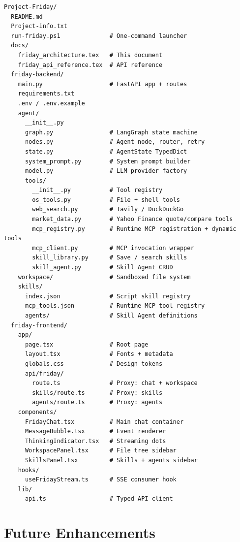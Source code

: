 \documentclass[11pt,a4paper]{article}
\begin{document}
\begin{lstlisting}[language={},title={Full monorepo layout}]
Project-Friday/
  README.md
  Project-info.txt
  run-friday.ps1              # One-command launcher
  docs/
    friday_architecture.tex   # This document
    friday_api_reference.tex  # API reference
  friday-backend/
    main.py                   # FastAPI app + routes
    requirements.txt
    .env / .env.example
    agent/
      __init__.py
      graph.py                # LangGraph state machine
      nodes.py                # Agent node, router, retry
      state.py                # AgentState TypedDict
      system_prompt.py        # System prompt builder
      model.py                # LLM provider factory
      tools/
        __init__.py           # Tool registry
        os_tools.py           # File + shell tools
        web_search.py         # Tavily / DuckDuckGo
        market_data.py        # Yahoo Finance quote/compare tools
        mcp_registry.py       # Runtime MCP registration + dynamic tools
        mcp_client.py         # MCP invocation wrapper
        skill_library.py      # Save / search skills
        skill_agent.py        # Skill Agent CRUD
    workspace/                # Sandboxed file system
    skills/
      index.json              # Script skill registry
      mcp_tools.json          # Runtime MCP tool registry
      agents/                 # Skill Agent definitions
  friday-frontend/
    app/
      page.tsx                # Root page
      layout.tsx              # Fonts + metadata
      globals.css             # Design tokens
      api/friday/
        route.ts              # Proxy: chat + workspace
        skills/route.ts       # Proxy: skills
        agents/route.ts       # Proxy: agents
    components/
      FridayChat.tsx          # Main chat container
      MessageBubble.tsx       # Event renderer
      ThinkingIndicator.tsx   # Streaming dots
      WorkspacePanel.tsx      # File tree sidebar
      SkillsPanel.tsx         # Skills + agents sidebar
    hooks/
      useFridayStream.ts      # SSE consumer hook
    lib/
      api.ts                  # Typed API client
\end{lstlisting}

\section{Future Enhancements}
\end{document}
